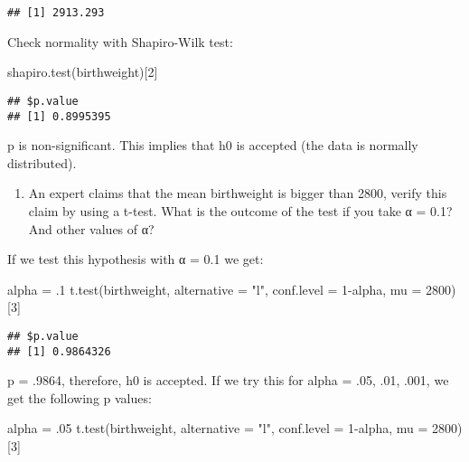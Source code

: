 \documentclass[
]{article}
\newenvironment{Shaded}{\begin{snugshade}}{\end{snugshade}}
\newcommand{\AttributeTok}[1]{\textcolor[rgb]{0.77,0.63,0.00}{#1}}
\newcommand{\DecValTok}[1]{\textcolor[rgb]{0.00,0.00,0.81}{#1}}
\newcommand{\FunctionTok}[1]{\textcolor[rgb]{0.00,0.00,0.00}{#1}}
\newcommand{\NormalTok}[1]{#1}
\newcommand{\OtherTok}[1]{\textcolor[rgb]{0.56,0.35,0.01}{#1}}
\newcommand{\SpecialCharTok}[1]{\textcolor[rgb]{0.00,0.00,0.00}{#1}}
\newcommand{\StringTok}[1]{\textcolor[rgb]{0.31,0.60,0.02}{#1}}
\providecommand{\tightlist}{%
  \setlength{\itemsep}{0pt}\setlength{\parskip}{0pt}}
\begin{document}
\begin{verbatim}
## [1] 2913.293
\end{verbatim}

Check normality with Shapiro-Wilk test:

\begin{Shaded}
\begin{Highlighting}[]
\FunctionTok{shapiro.test}\NormalTok{(birthweight)[}\DecValTok{2}\NormalTok{]}
\end{Highlighting}
\end{Shaded}

\begin{verbatim}
## $p.value
## [1] 0.8995395
\end{verbatim}

p is non-significant. This implies that h0 is accepted (the data is
normally distributed).

\begin{enumerate}
\def\labelenumi{\alph{enumi})}
\setcounter{enumi}{1}
\tightlist
\item
  An expert claims that the mean birthweight is bigger than 2800, verify
  this claim by using a t-test. What is the outcome of the test if you
  take α = 0.1? And other values of α?
\end{enumerate}

If we test this hypothesis with α = 0.1 we get:

\begin{Shaded}
\begin{Highlighting}[]
\NormalTok{alpha }\OtherTok{=}\NormalTok{ .}\DecValTok{1}
\FunctionTok{t.test}\NormalTok{(birthweight, }\AttributeTok{alternative =} \StringTok{"l"}\NormalTok{, }\AttributeTok{conf.level =} \DecValTok{1}\SpecialCharTok{{-}}\NormalTok{alpha, }\AttributeTok{mu =} \DecValTok{2800}\NormalTok{)[}\DecValTok{3}\NormalTok{]}
\end{Highlighting}
\end{Shaded}

\begin{verbatim}
## $p.value
## [1] 0.9864326
\end{verbatim}

p = .9864, therefore, h0 is accepted. If we try this for alpha = .05,
.01, .001, we get the following p values:

\begin{Shaded}
\begin{Highlighting}[]
\NormalTok{alpha }\OtherTok{=}\NormalTok{ .}\DecValTok{05}
\FunctionTok{t.test}\NormalTok{(birthweight, }\AttributeTok{alternative =} \StringTok{"l"}\NormalTok{, }\AttributeTok{conf.level =} \DecValTok{1}\SpecialCharTok{{-}}\NormalTok{alpha, }\AttributeTok{mu =} \DecValTok{2800}\NormalTok{)[}\DecValTok{3}\NormalTok{]}
\end{Highlighting}
\end{Shaded}
\end{document}
